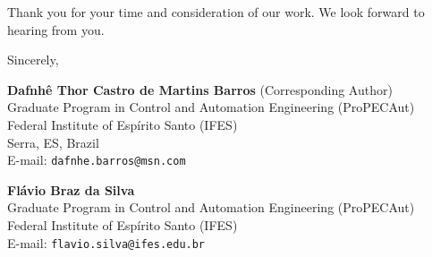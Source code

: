 \documentclass[11pt,a4paper]{article}
\begin{document}
Thank you for your time and consideration of our work. We look forward to hearing from you.

\vspace{0.6cm}
Sincerely,

\textbf{Dafnhê Thor Castro de Martins Barros} (Corresponding Author) \\
Graduate Program in Control and Automation Engineering (ProPECAut) \\
Federal Institute of Espírito Santo (IFES) \\
Serra, ES, Brazil \\
E-mail: \texttt{dafnhe.barros@msn.com}

\vspace{0.3cm}
\textbf{Flávio Braz da Silva} \\
Graduate Program in Control and Automation Engineering (ProPECAut) \\
Federal Institute of Espírito Santo (IFES) \\
E-mail: \texttt{flavio.silva@ifes.edu.br}
\end{document}

